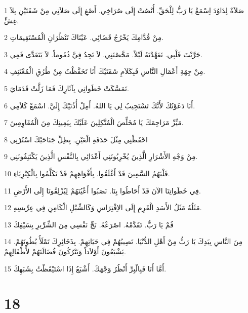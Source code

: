 \par 1 صَلاَةٌ لِدَاوُدَ اِسْمَعْ يَا رَبُّ لِلْحَقِّ. أُنْصُتْ إِلَى صُرَاخِي. أَصْغِ إِلَى صَلاَتِي مِنْ شَفَتَيْنِ بِلاَ غِشٍّ.
\par 2 مِنْ قُدَّامِكَ يَخْرُجُ قَضَائِي. عَيْنَاكَ تَنْظُرَانِ الْمُسْتَقِيمَاتِ.
\par 3 جَرَّبْتَ قَلْبِي. تَعَهَّدْتَهُ لَيْلاً. مَحَّصْتَنِي. لاَ تَجِدُ فِيَّ ذُمُوماً. لاَ يَتَعَدَّى فَمِي.
\par 4 مِنْ جِهَةِ أَعْمَالِ النَّاسِ فَبِكَلاَمِ شَفَتَيْكَ أَنَا تَحَفَّظْتُ مِنْ طُرُقِ الْمُعْتَنِفِ.
\par 5 تَمَسَّكَتْ خَطَواتِي بِآثَارِكَ فَمَا زَلَّتْ قَدَمَايَ.
\par 6 أَنَا دَعَوْتُكَ لأَنَّكَ تَسْتَجِيبُ لِي يَا اللهُ. أَمِلْ أُذُنَيْكَ إِلَيَّ. اسْمَعْ كَلاَمِي.
\par 7 مَيِّزْ مَرَاحِمَكَ يَا مُخَلِّصَ الْمُتَّكِلِينَ عَلَيْكَ بِيَمِينِكَ مِنَ الْمُقَاوِمِينَ.
\par 8 احْفَظْنِي مِثْلَ حَدَقَةِ الْعَيْنِ. بِظِلِّ جَنَاحَيْكَ اسْتُرْنِي
\par 9 مِنْ وَجْهِ الأَشْرَارِ الَّذِينَ يُخْرِبُونَنِي أَعْدَائِي بِالنَّفْسِ الَّذِينَ يَكْتَنِفُونَنِي.
\par 10 قَلْبَهُمُ السَّمِينَ قَدْ أَغْلَقُوا. بِأَفْوَاهِهِمْ قَدْ تَكَلَّمُوا بِالْكِبْرِيَاءِ.
\par 11 فِي خَطَواتِنَا الآنَ قَدْ أَحَاطُوا بِنَا. نَصَبُوا أَعْيُنَهُمْ لِيُزْلِقُونَا إِلَى الأَرْضِ.
\par 12 مَثَلُهُ مَثَلُ الأَسَدِ الْقَرِمِ إِلَى الاِفْتِرَاسِ وَكَالشِّبْلِ الْكَامِنِ فِي عِرِّيسِهِ.
\par 13 قُمْ يَا رَبُّ. تَقَدَّمْهُ. اصْرَعْهُ. نَجِّ نَفْسِي مِنَ الشِّرِّيرِ بِسَيْفِكَ
\par 14 مِنَ النَّاسِ بِيَدِكَ يَا رَبُّ مِنْ أَهْلِ الدُّنْيَا. نَصِيبُهُمْ فِي حَيَاتِهِمْ. بِذَخَائِرِكَ تَمْلَأُ بُطُونَهُمْ. يَشْبَعُونَ أَوْلاَداً وَيَتْرُكُونَ فُضَالَتَهُمْ لأَطْفَالِهِمْ.
\par 15 أَمَّا أَنَا فَبِالْبِرِّ أَنْظُرُ وَجْهَكَ. أَشْبَعُ إِذَا اسْتَيْقَظْتُ بِشَبَهِكَ.

\chapter{18}

